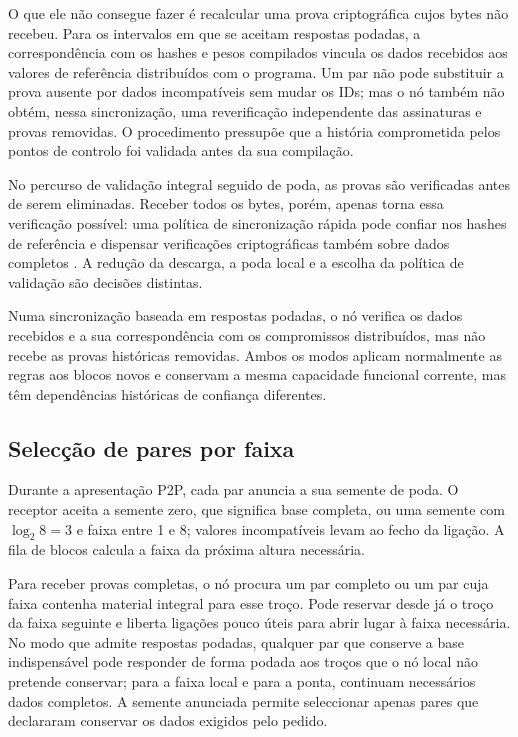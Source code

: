 O que ele não consegue fazer é recalcular uma prova criptográfica cujos bytes
não recebeu. Para os intervalos em que se aceitam respostas podadas,
a correspondência com os hashes e pesos
compilados vincula os dados recebidos aos valores de referência distribuídos
com o programa. Um par não pode substituir a prova ausente por dados
incompatíveis sem mudar os IDs; mas o nó também não obtém, nessa sincronização,
uma reverificação independente das assinaturas e provas removidas. O
procedimento pressupõe que a história comprometida pelos pontos de controlo
foi validada antes da sua compilação.

No percurso de validação integral seguido de poda, as provas são verificadas
antes de serem eliminadas. Receber todos os bytes, porém, apenas torna essa
verificação possível: uma política de sincronização rápida pode confiar nos
hashes de referência e dispensar verificações criptográficas também sobre
dados completos \cite{monero-source-v16}. A redução da descarga, a poda local
e a escolha da política de validação são decisões distintas.

Numa sincronização baseada em respostas podadas, o nó
verifica os dados recebidos e a sua correspondência com os compromissos
distribuídos, mas não recebe as provas históricas removidas. Ambos os modos
aplicam normalmente as regras aos blocos novos e conservam a mesma capacidade
funcional corrente, mas têm dependências históricas de confiança diferentes.


\subsection{Selecção de pares por faixa}
\label{subsec:pruned-peer-selection}

Durante a apresentação P2P, cada par anuncia a sua semente de poda. O receptor
aceita a semente zero, que significa base completa, ou uma semente com
\(\log_2 8=3\) e faixa entre 1 e 8; valores incompatíveis levam ao fecho da
ligação. A fila de blocos calcula a faixa da próxima altura necessária.

Para receber provas completas, o nó procura um par completo ou um par cuja
faixa contenha material integral para esse troço. Pode reservar desde já o
troço da faixa seguinte e liberta ligações pouco úteis para abrir lugar à
faixa necessária. No modo que admite respostas podadas, qualquer par que conserve a base
indispensável pode responder de forma podada aos troços que o nó local não
pretende conservar; para a faixa local e para a ponta, continuam necessários
dados completos. A semente anunciada permite seleccionar apenas pares que
declararam conservar os dados exigidos pelo pedido.

